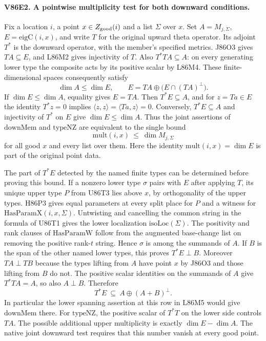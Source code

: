 \paragraph{V86E2. A pointwise multiplicity test for both downward conditions.}
Fix a location $i$, a point $x\in Z_{\rm good}(i)$ and
a list $\Sigma$ over $x$. Set $A=M_{j,\Sigma}$,
$E=\mathrm{eigC}(i,x)$, and write $T$ for the original upward
theta operator. Its adjoint $T^*$ is the downward operator, with
the member's specified metrics. J86O3 gives $TA\subseteq E$,
and L86M2 gives injectivity of $T$. Also $T^*TA\subseteq A$:
on every generating lower type the composite acts by its positive
scalar by L86M4. These finite-dimensional spaces consequently satisfy
\[
 \dim A\le\dim E,\qquad E=TA\oplus\big(E\cap(TA)^\perp\big).
\]
If $\dim E\le\dim A$, equality gives $E=TA$. Then $T^*E\subseteq A$,
and for $z=Ta\in E$ the identity $T^*z=0$ implies
$\langle z,z\rangle=\langle Ta,z\rangle=0$.
Conversely, $T^*E\subseteq A$ and injectivity of $T^*$ on $E$
give $\dim E\le\dim A$. Thus the joint assertions of
$\mathrm{downMem}$ and $\mathrm{typeNZ}$ are equivalent to the
single bound
\[
                  \mathrm{mult}(i,x)\ \le\ \dim M_{j,\Sigma}
\]
for all good $x$ and every list over them. Here the identity
$\mathrm{mult}(i,x)=\dim E$ is part of the original point data.

The part of $T^*E$ detected by the named finite types can be
determined before proving this bound. If a nonzero lower type
$\sigma$ pairs with $E$ after applying $T$, its unique upper
type $P$ from U86T3 lies above $x$, by orthogonality of the upper
types. H86P3 gives equal parameters at every split place for
$P$ and a witness for $\mathrm{HasParamX}(i,x,\Sigma)$.
Untwisting and cancelling the common string in the formula of
U86T1 gives the lower localization $\mathrm{isoLoc}(\Sigma)$.
The positivity and rank clauses of $\mathrm{HasParamW}$ follow
from the augmented base-change list on removing the positive
rank-$t$ string. Hence $\sigma$ is among the summands of $A$.
If $B$ is the span of the other named lower types, this proves
$T^*E\perp B$. Moreover $TA\perp TB$ because the types lifting
from $A$ have point $x$ by J86O3 and those lifting from $B$ do
not. The positive scalar identities on the summands of $A$
give $T^*TA=A$, so also $A\perp B$. Therefore
\[
                T^*E\ \subseteq\ A\oplus (A+B)^\perp .
\]
In particular the lower spanning assertion at this row in L86M5
would give $\mathrm{downMem}$ there. For $\mathrm{typeNZ}$, the
positive scalar of $T^*T$ on the lower side controls $TA$.
The possible additional upper multiplicity is exactly
$\dim E-\dim A$. The native joint downward test requires that
this number vanish at every good point.
